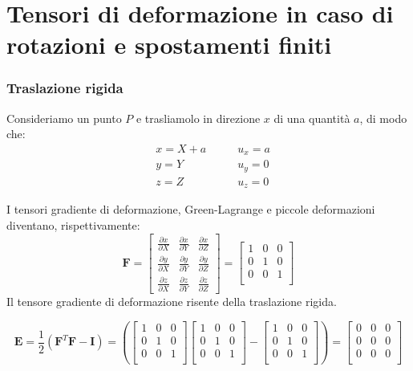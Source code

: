 \section{Tensori di deformazione in caso di rotazioni e spostamenti finiti}

\subsubsection*{Traslazione rigida}

Consideriamo un punto $P$ e trasliamolo in direzione $x$ di una quantità $a$, di modo che:
\begin{align*}
    &x = X + a \quad\quad &u_x = a\\
    &y = Y &u_y = 0\\
    &z = Z &u_z = 0
\end{align*}

I tensori gradiente di deformazione, Green-Lagrange e piccole deformazioni diventano, rispettivamente: 
\begin{equation*}
\boldsymbol{F} = 
\begin{bmatrix}
\frac{\partial x}{\partial X} & \frac{\partial x}{\partial Y} & \frac{\partial x}{\partial Z} \\
\frac{\partial y}{\partial X} & \frac{\partial y}{\partial Y} & \frac{\partial y}{\partial Z} \\
\frac{\partial z}{\partial X} & \frac{\partial z}{\partial Y} & \frac{\partial z}{\partial Z}
\end{bmatrix} = 
\begin{bmatrix}
   1 & 0 & 0 \\
   0 & 1 & 0 \\
   0 & 0 & 1 \\
\end{bmatrix}
\end{equation*}
Il tensore gradiente di deformazione risente della traslazione rigida.

 \begin{equation*}
\boldsymbol{E} = \frac{1}{2} \left(\boldsymbol{F}^T \boldsymbol{F} - \boldsymbol{I}\right)
= \left(\begin{bmatrix}
   1 & 0 & 0 \\
   0 & 1 & 0 \\
   0 & 0 & 1 \\
\end{bmatrix} 
\begin{bmatrix}
   1 & 0 & 0 \\
   0 & 1 & 0 \\
   0 & 0 & 1 \\
\end{bmatrix} -
\begin{bmatrix}
   1 & 0 & 0 \\
   0 & 1 & 0 \\
   0 & 0 & 1 \\
\end{bmatrix}\right) =
\begin{bmatrix}
   0 & 0 & 0 \\
   0 & 0 & 0 \\
   0 & 0 & 0 \\
\end{bmatrix}
\end{equation*}

